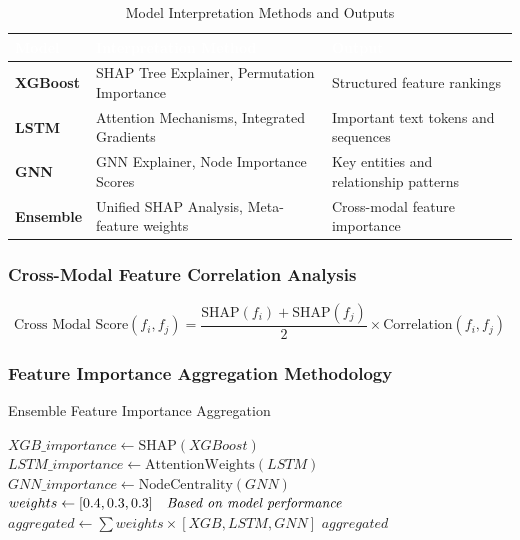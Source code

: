 \documentclass[12pt,a4paper,oneside]{report}
\numberwithin{equation}{chapter}
\renewcommand{\arraystretch}{1.6}
\begin{document}
\begin{table}[H]
\centering
\caption{Model Interpretation Methods and Outputs}
\label{tab:model_interpretation}
\renewcommand{\arraystretch}{1.4}
\begin{tabular}{L{3cm} L{5cm} L{5cm}}
\toprule
{}
\textcolor{white}{\textbf{Model}} &
\textcolor{white}{\textbf{Interpretation Method}} &
\textcolor{white}{\textbf{Output}} \\
\midrule
{}
\textbf{XGBoost}  & SHAP Tree Explainer, Permutation Importance & Structured feature rankings \\
\textbf{LSTM}     & Attention Mechanisms, Integrated Gradients  & Important text tokens and sequences \\
\textbf{GNN}      & GNN Explainer, Node Importance Scores       & Key entities and relationship patterns \\
\textbf{Ensemble} & Unified SHAP Analysis, Meta-feature weights & Cross-modal feature importance \\
\bottomrule
\end{tabular}
\end{table}

\subsubsection{Cross-Modal Feature Correlation Analysis}
\label{sec:cross-modal}

\begin{equation}
\text{Cross Modal Score}(f_i, f_j) = \frac{\text{SHAP}(f_i) + \text{SHAP}(f_j)}{2} \times \text{Correlation}(f_i, f_j)
\end{equation}

\subsubsection{Feature Importance Aggregation Methodology}

\begin{algorithm}[H]
\caption{Ensemble Feature Importance Aggregation}
\label{alg:feature-aggregation}
\begin{algorithmic}[1]
\State $XGB\_importance \gets \text{SHAP}(XGBoost)$
\State $LSTM\_importance \gets \text{AttentionWeights}(LSTM)$
\State $GNN\_importance \gets \text{NodeCentrality}(GNN)$
\State $weights \gets [0.4, 0.3, 0.3] \quad \text{\textit{Based on model performance}}$
\State $aggregated \gets \sum weights \times [XGB, LSTM, GNN]$
\State \Return $aggregated$
\EndProcedure
\end{algorithmic}
\end{algorithm}
\end{document}
